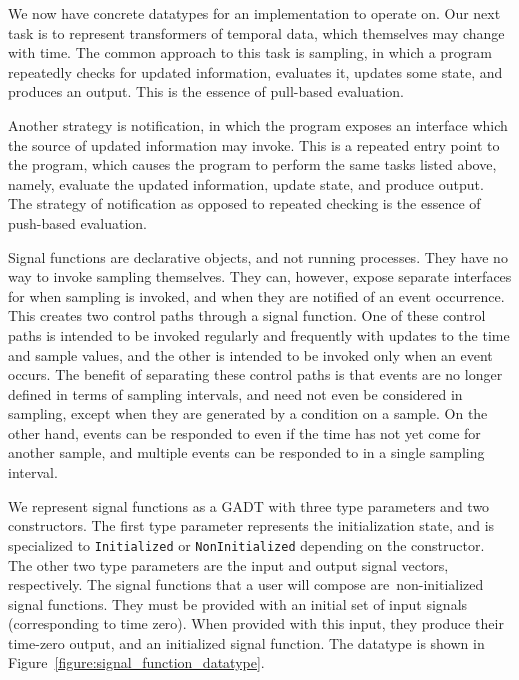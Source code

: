 We now have concrete datatypes for an implementation to operate on. Our next
task is to represent transformers of temporal data, which themselves may change
with time. The common approach to this task is sampling, in which a program
repeatedly checks for updated information, evaluates it, updates some state,
and produces an output. This is the essence of pull-based evaluation.

Another strategy is notification, in which the program exposes an interface
which the source of updated information may invoke. This is a repeated entry
point to the program, which causes the program to perform the same tasks
listed above, namely, evaluate the updated information, update state, and
produce output. The strategy of notification as opposed to repeated checking is
the essence of push-based evaluation.

Signal functions are declarative objects, and not running processes. They have
no way to invoke sampling themselves. They can, however, expose separate
interfaces for when sampling is invoked, and when they are notified of an event
occurrence. This creates two control paths through a signal function. One of
these control paths is intended to be invoked regularly and frequently with
updates to the time and sample values, and the other is intended to be invoked
only when an event occurs. The benefit of separating these control paths is that
events are no longer defined in terms of sampling intervals, and need not even
be considered in sampling, except when they are generated by a condition on a
sample. On the other hand, events can be responded to even if the time has not
yet come for another sample, and multiple events can be responded to in a single
sampling interval.

We represent signal functions as a GADT with three type parameters and two 
constructors. The first type parameter represents the initialization state,
and is specialized to {\tt Initialized} or {\tt NonInitialized} depending on the
constructor. The other two type parameters are the input and output signal
vectors, respectively. The signal functions that a user will compose are\
non-initialized signal functions. They must be provided with an initial set of
input signals (corresponding to time zero). When provided with this input, they
produce their time-zero output, and an initialized signal function. The datatype
is shown in Figure~\ref{figure:signal_function_datatype}.

